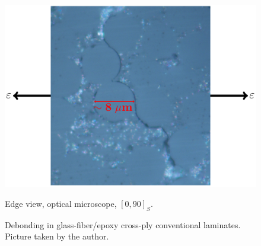 \begin{figure}[!h]
\centering
        \includegraphics[width=\textwidth]{pics/transversecracks-micro.pdf}
       \caption{Edge view, optical microscope, $\left[0,90\right]_{S}$.}
\caption{Debonding in glass-fiber/epoxy cross-ply conventional laminates. Picture taken by the author.}\label{intro:fig:debonding}
\end{figure}

